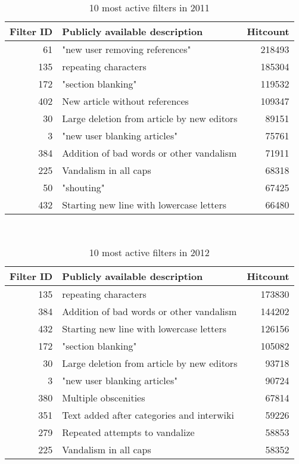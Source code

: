 \begin{table}
  \centering
  \begin{tabular}{r p{9cm} r }
    Filter ID & Publicly available description & Hitcount \\
    \hline
    61 & "new user removing references"& 218493 \\
    135 & repeating characters & 185304 \\
    172 & "section blanking" & 119532 \\
    402 & New article without references & 109347 \\
    30 & Large deletion from article by new editors & 89151 \\
    3 & "new user blanking articles" & 75761 \\
    384 & Addition of bad words or other vandalism & 71911 \\
    225 & Vandalism in all caps & 68318 \\
    50 & "shouting" & 67425 \\
    432 & Starting new line with lowercase letters & 66480 \\
  \end{tabular}
  \caption{10 most active filters in 2011}~\label{tab:app-most-active-2011}
\end{table}

\begin{table}
  \centering
  \begin{tabular}{r p{9cm} r }
    Filter ID & Publicly available description & Hitcount \\
    \hline
    135 & repeating characters & 173830 \\
    384 & Addition of bad words or other vandalism & 144202 \\
    432 & Starting new line with lowercase letters & 126156 \\
    172 & "section blanking" & 105082 \\
    30 & Large deletion from article by new editors & 93718 \\
    3 & "new user blanking articles" & 90724 \\
    380 & Multiple obscenities & 67814 \\
    351 & Text added after categories and interwiki & 59226 \\
    279 & Repeated attempts to vandalize & 58853 \\
    225 & Vandalism in all caps & 58352 \\
  \end{tabular}
  \caption{10 most active filters in 2012}~\label{tab:app-most-active-2012}
\end{table}

